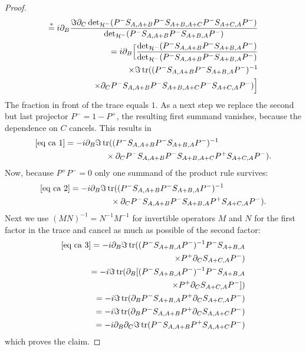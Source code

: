 \documentclass[b5paper,draft,openbib,12pt]{memoir}
\DeclareMathOperator{\tr}{tr}
\begin{document}
\begin{proof}
\begin{align}
\overset{*}{=}
i\partial_B \frac{\Im \partial_C \det_{\mathcal{H}^-}(P^-S_{A,A+B}P^-S_{A+B,A+C}P^- S_{A+C,A}P^-)}{\det_{\mathcal{H}^-}(P^-S_{A,A+B}P^-S_{A+B,A}P^-)}\\\notag
=i\partial_B \Big[\frac{\det_{\mathcal{H}^-}(P^-S_{A,A+B}P^-S_{A+B,A}P^-)}{\det_{\mathcal{H}^-}(P^-S_{A,A+B}P^-S_{A+B,A}P^-)}\\\notag
\times \Im  \tr ((P^-S_{A,A+B}P^-S_{A+B,A}P^-)^{-1}\\
\times\partial_C P^-S_{A,A+B}P^-S_{A+B,A+C}P^- S_{A+C,A}P^-)\Big]\label{eq ca 1}
\end{align}
The fraction in front of the trace equals \(1\). As a next step we replace the second but last projector \(P^-=1-P^+\), the resulting first summand vanishes,
because the dependence on \(C\) cancels. This results in 
\begin{align}\notag
&\eqref{eq ca 1}=-i\partial_B \Im \tr((P^-S_{A,A+B}P^-S_{A+B,A}P^-)^{-1}\\
&\hspace{3cm}\times\partial_C P^-S_{A,A+B}P^-S_{A+B,A+C}P^+ S_{A+C,A}P^-).\label{eq ca 2}
\end{align}
Now, because \(P^+P^-=0\) only one summand of the product rule survives:
\begin{align}\notag
&\eqref{eq ca 2}=-i\partial_B \Im \tr((P^-S_{A,A+B}P^-S_{A+B,A}P^-)^{-1}\\
&\hspace{3cm}\times\partial_C P^-S_{A,A+B}P^-S_{A+B,A}P^+ S_{A+C,A}P^-).\label{eq ca 3}
\end{align}
Next we use 
\((M N )^{-1}= N^{-1} M^{-1}\) for invertible operators \(M\) and \(N\) for the first factor in the trace and cancel as much as possible of
the second factor:
\begin{align}\notag
\eqref{eq ca 3}=-i\partial_B \Im \tr((P^-S_{A+B,A}P^-)^{-1}  P^-S_{A+B,A}\\
\times P^+ \partial_C S_{A+C,A}P^-)\\\notag
=-i \Im \tr(\partial_B[(P^-S_{A+B,A}P^-)^{-1}  P^-S_{A+B,A}\\
\times P^+ \partial_C S_{A+C,A}P^-])\\
=-i \Im \tr(\partial_B  P^-S_{A+B,A}P^+ \partial_C S_{A+C,A}P^-)\\
=-i \Im \tr(\partial_B  P^-S_{A,A+B}P^+ \partial_C S_{A,A+C}P^-)\\
=-i \partial_B\partial_C\Im \tr(  P^-S_{A,A+B}P^+  S_{A,A+C}P^-)
\end{align}
which proves the claim.

\end{proof}
\end{document}

